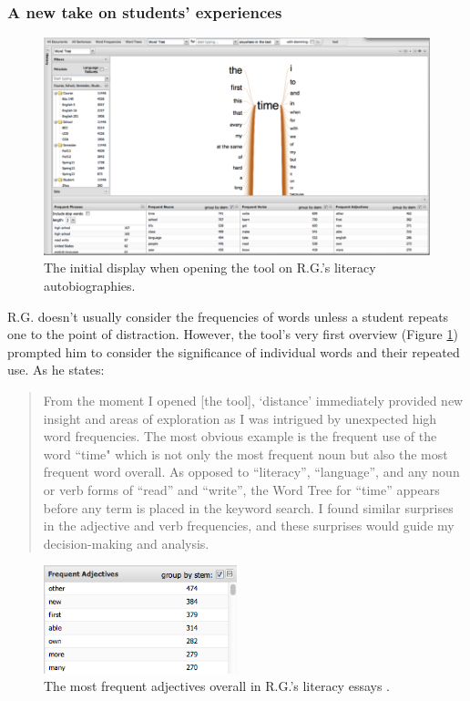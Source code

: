 \documentclass{sig-alternate}
\begin{document}
 \subsubsection{A new take on students' experiences}

\begin{figure}
\includegraphics[width=\textwidth]{fig/rex/01.png}
\caption{The initial display when opening the tool \label{fig:rex01} on R.G.'s literacy autobiographies.}
\end{figure}

R.G. doesn't usually consider the frequencies of words unless a student repeats one to the point of distraction. However, the tool's very first overview (Figure \ref{fig:rex01}) prompted him to consider the significance of individual words and their repeated use.  As he states:
\begin{quote}
From the moment I opened [the tool], `distance' immediately provided new insight and areas of exploration as I was intrigued by unexpected high word frequencies.  The most obvious example is the frequent use of the word ``time" which is not only the most frequent noun but also the most frequent word overall.  As opposed to ``literacy'', ``language'', and any noun or verb forms of ``read'' and ``write'', the Word Tree for ``time'' appears before any term is placed in the keyword search.   I found similar surprises in the adjective and verb frequencies, and these surprises would guide my decision-making and analysis.
\end{quote}

\begin{figure}
\includegraphics[width=0.5\textwidth]{fig/rex/02.png}
\caption{The most frequent adjectives overall in R.G.'s literacy essays \label{fig:rex02}.}
\end{figure}
\end{document}
